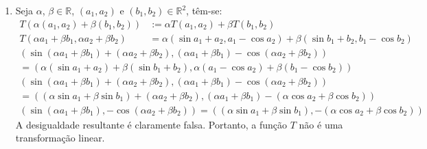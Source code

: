 \begin{resolution}
\begin{enumerate}[label=\alph*)]
    \item  Seja $\alpha$, $\beta \in \mathbb{R}$, $(a_1, a_2)$ e $(b_1, b_2) \in \mathbb{R}^2$, têm-se:
          \begin{align}
            T(\alpha(a_1,a_2) + \beta(b_1,b_2))               & := \alpha T(a_1, a_2) + \beta T(b_1, b_2)                                          \\
            T(\alpha a_1 + \beta b_1, \alpha a_2 + \beta b_2) & = \alpha (\sin a_1 + a_2, a_1 - \cos a_2) + \beta (\sin b_1 + b_2, b_1 - \cos b_2)
          \end{align}
          \vspace{-58pt}
          \begin{multline}
            (\sin(\alpha a_1 + \beta b_1) + (\alpha a_2 + \beta b_2), (\alpha a_1 + \beta b_1) - \cos(\alpha a_2 + \beta b_2)) \\ = (\alpha (\sin a_1 + a_2) + \beta (\sin b_1 + b_2), \alpha (a_1 - \cos a_2) + \beta (b_1 - \cos b_2))
          \end{multline}
          \vspace{-58pt}
          \begin{multline}
            (\sin(\alpha a_1 + \beta b_1) + (\alpha a_2 + \beta b_2), (\alpha a_1 + \beta b_1) - \cos(\alpha a_2 + \beta b_2)) \\ = ((\alpha \sin a_1 + \beta \sin b_1) + (\alpha a_2  + \beta b_2), (\alpha a_1 + \beta b_1) - (\alpha \cos a_2  + \beta \cos b_2))
          \end{multline}
          \vspace{-50pt}
          \begin{gather}
            (\sin(\alpha a_1 + \beta b_1), - \cos(\alpha a_2 + \beta b_2)) = ((\alpha \sin a_1 + \beta \sin b_1), - (\alpha \cos a_2  + \beta \cos b_2))
          \end{gather}
          A desigualdade resultante é claramente falsa. Portanto, a função $T$ não é uma transformação linear.
  \end{enumerate}
\end{resolution}

